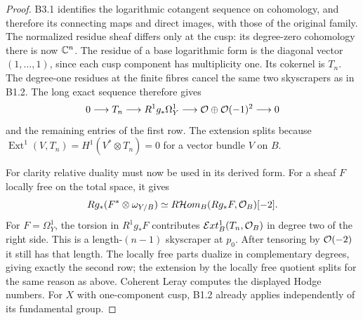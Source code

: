 \begin{proof}
B3.1 identifies the logarithmic cotangent sequence on cohomology,
and therefore its connecting maps and direct images, with those of
the original family. The normalized residue sheaf differs only at
the cusp: its degree-zero cohomology there is now $\mathbb C^n$.
The residue of a base logarithmic form is the diagonal vector
$(1,\ldots,1)$, since each cusp component has multiplicity one.
Its cokernel is $T_n$. The degree-one residues at the finite fibres
cancel the same two skyscrapers as in B1.2. The long exact sequence
therefore gives
\[
0\longrightarrow T_n\longrightarrow R^1g_*\Omega^1_Y
\longrightarrow\mathcal O\oplus\mathcal O(-1)^2\longrightarrow0
\]
and the remaining entries of the first row. The extension splits
because $\operatorname{Ext}^1(V,T_n)=H^1(V^*\otimes T_n)=0$
for a vector bundle $V$ on $B$.

For clarity relative duality must now be used in its derived form.
For a sheaf $F$ locally free on the total space, it gives
\[
Rg_*(F^*\otimes\omega_{Y/B})
\simeq R\mathcal Hom_B(Rg_*F,\mathcal O_B)[-2].
\]
For $F=\Omega^1_Y$, the torsion in $R^1g_*F$ contributes
$\mathcal Ext^1_B(T_n,\mathcal O_B)$ in degree two of the right side.
This is a length-$(n-1)$ skyscraper at $p_0$. After tensoring by
$\mathcal O(-2)$ it still has that length. The locally free parts dualize
in complementary degrees, giving exactly the second row; the
extension by the locally free quotient splits for the same reason
as above. Coherent Leray computes the displayed Hodge numbers.
For $X$ with one-component cusp, B1.2 already applies independently
of its fundamental group.
\end{proof}

